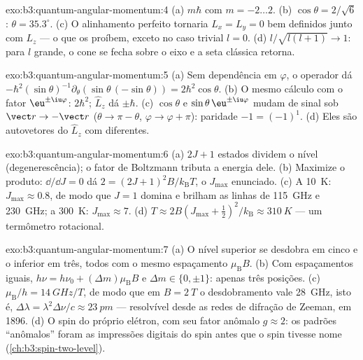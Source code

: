 \begin{solution}{exo:b3:quantum-angular-momentum:4}
(a) $m\hbar$ com $m = -2 \dots 2$. (b) $\cos\theta = 2/\sqrt6$:
$\theta = 35.3^\circ$. (c) O alinhamento perfeito tornaria $L_x = L_y
= 0$ bem definidos junto com $L_z$ --- o que os  proíbem,
exceto no caso trivial $l = 0$. (d) $l/\sqrt{l(l+1)} \to 1$: para $l$
grande, o cone se fecha sobre o eixo e a seta clássica retorna.
\end{solution}

\begin{solution}{exo:b3:quantum-angular-momentum:5}
(a) Sem dependência em $\varphi$, o operador dá
$-\hbar^2(\sin\theta)^{-1}\partial_\theta(\sin\theta\,(-\sin\theta))
= 2\hbar^2\cos\theta$. (b) O mesmo cálculo com o fator
$\eu^{\pm\iu\varphi}$:  $2\hbar^2$; $\hat L_z$ dá $\pm\hbar$.
(c) $\cos\theta$ e $\sin\theta\,\eu^{\pm\iu
\varphi}$ mudam de sinal sob $\vect r \to -\vect r$ ($\theta \to \pi
- \theta$, $\varphi \to \varphi + \pi$): paridade $-1 = (-1)^1$. (d)
Eles são autovetores do  $\hat L_z$ com 
diferentes.
\end{solution}

\begin{solution}{exo:b3:quantum-angular-momentum:6}
(a) $2J + 1$ estados dividem o nível (degenerescência); o fator de
Boltzmann tributa a energia dele. (b) Maximize o produto: $\dd/\dd J = 0$
dá $2 = (2J+1)^2B/k_{\text{B}}T$, o $J_{\max}$ enunciado. (c) A
\qty{10}{K}: $J_{\max} \approx 0.8$, de modo que $J = 1$ domina e
brilham as linhas de \qty{115}{GHz} e \qty{230}{GHz}; a \qty{300}{K}:
$J_{\max} \approx 7$. (d) $T \approx 2B(J_{\max} + \tfrac12)^2/
k_{\text{B}} \approx \qty{310}{K}$ --- um termômetro rotacional.
\end{solution}

\begin{solution}{exo:b3:quantum-angular-momentum:7}
(a) O nível superior se desdobra em cinco e o inferior em três, todos
com o mesmo espaçamento $\mu_{\text{B}}B$. (b) Com espaçamentos iguais,
$h\nu = h\nu_0 + (\Delta m)\mu_{\text{B}}B$ e $\Delta m \in \{0,
\pm1\}$: apenas três posições. (c) $\mu_{\text{B}}/h = \qty{14}{GHz/T}$, de modo que em $B = \qty{2}{T}$
o desdobramento vale \qty{28}{GHz}, isto é, $\Delta\lambda =
\lambda^2\Delta\nu/c \approx \qty{23}{pm}$ --- resolvível desde as
redes de difração de Zeeman, em 1896.
(d) O spin do próprio elétron, com seu fator anômalo $g \approx
2$: os padrões ``anômalos'' foram as impressões digitais do spin antes
que o spin tivesse nome (\cref{ch:b3:spin-two-level}).
\end{solution}


